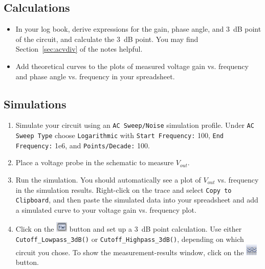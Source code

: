 \documentclass[11pt]{article}
\begin{document}
\subsection*{Calculations}

\begin{itemize}
\item In your log book, derive expressions for the gain, phase angle,
  and 3~dB point of the circuit, and calculate the 3~dB point. You may
  find Section~\ref{sec:acvdiv} of the notes helpful.

\item Add theoretical curves to the plots of measured voltage gain
  vs. frequency and phase angle vs. frequency in your spreadsheet.
\end{itemize}

\subsection*{Simulations}

\begin{enumerate}
\item Simulate your circuit using an \texttt{AC Sweep/Noise}
  simulation profile. Under \texttt{AC Sweep Type} choose
  \texttt{Logarithmic} with \texttt{Start Frequency:} 100,
  \texttt{End Frequency:} 1e6, and \texttt{Points/Decade:} 100. 

\item Place a voltage probe in the schematic to measure $V_{out}$.

\item Run the simulation. You should automatically see a plot of
  $V_{out}$ vs. frequency in the simulation results. Right-click on
  the trace and select \texttt{Copy to Clipboard}, and then paste the
  simulated data into your spreadsheet and add a simulated curve to
  your voltage gain vs. frequency plot.
  
\item Click on the \includegraphics{PSpiceAD_DefineMeasurement.png}
  button and set up a 3~dB point calculation. Use either
  \verb+Cutoff_Lowpass_3dB()+ or \verb+Cutoff_Highpass_3dB()+,
  depending on which circuit you chose. To show the
  measurement-results window, click on the
  \includegraphics{PSpiceAD_ToggleMeasurement.png} button.
\end{enumerate}
\end{document}
